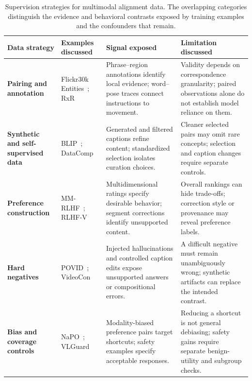 \begin{table}[t]
\centering
\caption{Supervision strategies for multimodal alignment data. The overlapping categories distinguish the evidence and behavioral contrasts exposed by training examples and the confounders that remain.}
\label{tab:data-summary}
\footnotesize
\setlength{\tabcolsep}{4pt}
\renewcommand{\arraystretch}{1.18}
\begin{tabularx}{\textwidth}{>{\raggedright\arraybackslash}p{}>{\raggedright\arraybackslash}p{}>{\raggedright\arraybackslash}X>{\raggedright\arraybackslash}X}
\toprule
\rowcolor{surveyheader}
\textbf{Data strategy} & \textbf{Examples discussed} & \textbf{Signal exposed} & \textbf{Limitation discussed} \\
\midrule
\textbf{Pairing and annotation} & Flickr30k Entities~\cite{Plummer2015Flickr30kEC}; RxR~\cite{Ku2020RoomAcrossRoomMV} & Phrase--region annotations identify local evidence; word--pose traces connect instructions to movement. & Validity depends on correspondence granularity; paired observations alone do not establish model reliance on them. \\
\textbf{Synthetic and self-supervised data} & BLIP~\cite{li2022blip}; DataComp~\cite{gadre2023datacomp} & Generated and filtered captions refine content; standardized selection isolates curation choices. & Cleaner selected pairs may omit rare concepts; selection and caption changes require separate controls. \\
\textbf{Preference construction} & MM-RLHF~\cite{pmlr-v267-zhang25cs}; RLHF-V~\cite{yu2024rlhf} & Multidimensional ratings specify desirable behavior; segment corrections identify unsupported content. & Overall rankings can hide trade-offs; correction style or provenance may reveal preference labels. \\
\textbf{Hard negatives} & POVID~\cite{Zhou2024AligningMI}; VideoCon~\cite{Bansal2023VideoConRV} & Injected hallucinations and controlled caption edits expose unsupported answers or compositional errors. & A difficult negative must remain unambiguously wrong; synthetic artifacts can replace the intended contrast. \\
\textbf{Bias and coverage controls} & NaPO~\cite{Zhang2025DebiasingML}; VLGuard~\cite{zong2024vlguard} & Modality-biased preference pairs target shortcuts; safety examples specify acceptable responses. & Reducing a shortcut is not general debiasing; safety gains require separate benign-utility and subgroup checks. \\
\bottomrule
\end{tabularx}
\end{table}
